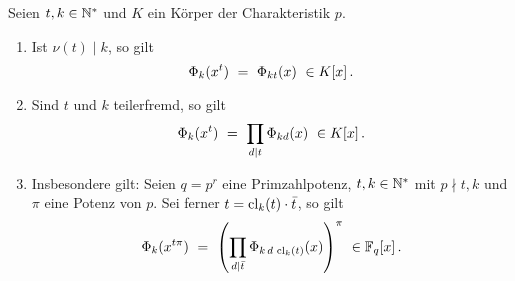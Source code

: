 \begin{satz}
  \label{satz:zusammenhang_unterschiedlicher_kreisteilungspolys}
  Seien $t,k \in \mathbb{N}^\ast$ und $K$ ein Körper der Charakteristik $p$.
  \begin{enumerate}
    \item Ist $\nu(t) \mid k$, so gilt
      \[ \Phi_k(x^t) \speq= \Phi_{kt}(x) \ \in K[x]\,.\]
    \item Sind $t$ und $k$ teilerfremd, so gilt
      \[ \Phi_k(x^t) \ =\  \prod_{d\mid t} \Phi_{kd}(x)\ \in K[x]\,.\]
    \item Insbesondere gilt: Seien $q = p^r$ eine Primzahlpotenz,
      $t,k\in\mathbb{N}^\ast$ mit $p\nmid t,k$ und $\pi$ eine Potenz von $p$. Sei ferner
      $t = \operatorname{cl}_k(t)\cdot \bar t$, so gilt
      \[ \Phi_k(x^{t\pi}) \ =\  
        \left(\prod_{d\mid \bar t} \Phi_{k\,d\,\operatorname{cl}_k(t)} (x)\right)^\pi
        \ \in \mathbb{F}_q[x]\,. \]
  \end{enumerate}
\end{satz}
